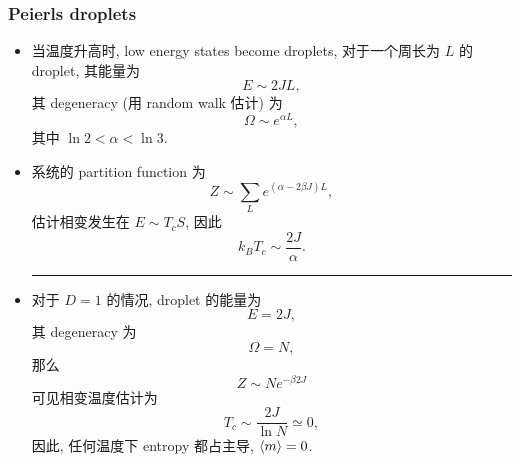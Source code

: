 \subsubsection{Peierls droplets}
\begin{itemize}
	\item 当温度升高时, low energy states become droplets, 对于一个周长为 $L$ 的 droplet, 其能量为
	\begin{equation}
		E \sim 2 J L,
	\end{equation}
	其 degeneracy (用 random walk 估计) 为
	\begin{equation}
		\Omega \sim e^{\alpha L},
	\end{equation}
	其中 $\ln 2 < \alpha < \ln 3$.
	
	\item 系统的 partition function 为
	\begin{equation}
		Z \sim \sum_L e^{(\alpha - 2 \beta J) L},
	\end{equation}
	估计相变发生在 $E \sim T_c S$, 因此
	\begin{equation} \label{11.4.16}
		k_B T_c \sim \frac{2 J}{\alpha}.
	\end{equation}
	
	\noindent\rule[0.5ex]{\linewidth}{0.5pt} %
	
	\item 对于 $D = 1$ 的情况, droplet 的能量为
	\begin{equation}
		E = 2 J,
	\end{equation}
	其 degeneracy 为
	\begin{equation}
		\Omega = N,
	\end{equation}
	那么
	\begin{equation}
		Z \sim N e^{- \beta 2 J}
	\end{equation}
	可见相变温度估计为
	\begin{equation}
		T_c \sim \frac{2 J}{\ln N} \simeq 0,
	\end{equation}
	因此, 任何温度下 entropy 都占主导, $\braket{m} = 0$.
\end{itemize}

